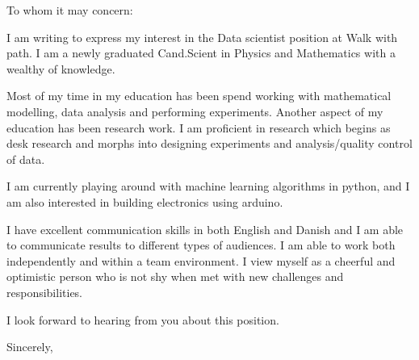 \documentclass[10pt,a4paper]{letter}
\begin{document}
\begin{letter}{}
\opening{To whom it may concern:}

I am writing to express my interest in the Data scientist position at Walk with path. I am a newly graduated Cand.Scient in Physics and Mathematics with a wealthy of knowledge. 

Most of my time in my education has been spend working with mathematical modelling, data analysis and performing experiments. Another aspect of my education has been research work. I am proficient in research which begins as desk research and morphs into designing experiments and analysis/quality control of data. 

I am currently playing around with machine learning algorithms in python, and I am also interested in building electronics using arduino. 

I have excellent communication skills in both English and Danish and I am able to communicate results to different types of audiences. I am able to work both independently and within a team environment. I view myself as a cheerful and optimistic person who is not shy when met with new challenges and responsibilities.

I look forward to hearing from you about this position.   

\closing{Sincerely,}

\end{letter}
\end{document}
